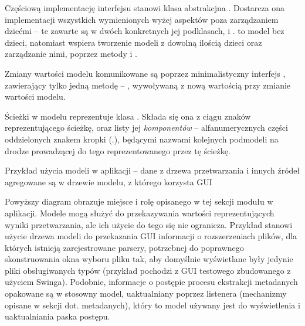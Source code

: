 Częściową implementację interfejsu  stanowi klasa abstrakcjna .
Dostarcza ona implementacji wszystkich wymienionych wyżej aspektów poza zarządzaniem dziećmi -- te
zawarte są w dwóch konkretnych jej podklasach,  i .
 to model bez dzieci, natomiast  wspiera tworzenie modeli z
dowolną ilością dzieci oraz zarządzanie nimi, poprzez metody  i .

Zmiany wartości modelu komunikowane są poprzez minimalistyczny interfejs ,
zawierający tylko jedną metodę -- , wywoływaną z nową wartością przy zmianie wartości
modelu.

Ścieżki w modelu reprezentuje klasa . Składa się ona z ciągu znaków reprezentującego
ścieżkę, oraz listy jej \emph{komponentów} -- alfanumerycznych części oddzielonych znakem kropki
(.), będącymi nazwami kolejnych podmodeli na drodze prowadzącej do tego reprezentowanego przez tę
ścieżkę.

{Przykład użycia modeli w aplikacji -- dane z drzewa przetwarzania i innych źródeł agregowane są w
drzewie modelu, z którego korzysta GUI}

Powyższy diagram obrazuje miejsce i rolę opisanego w tej sekcji modułu w aplikacji. Modele mogą
służyć do przekazywania wartości reprezentujących wyniki przetwarzania, ale ich użycie do tego się
nie ogranicza. Przykład stanowi użycie drzewa modeli do przekazania GUI informacji o rozszerzeniach
plików, dla których istnieją zarejestrowane parsery, potrzebnej do poprawnego skonstruowania okna
wyboru pliku tak, aby domyślnie wyświetlane były jedynie pliki obsługiwanych typów (przykład
pochodzi z GUI testowego zbudowanego z użyciem Swinga). Podobnie, informacje o postępie procesu
ekstrakcji metadanych opakowane są w stosowny model, uaktualniany poprzez listenera (mechanizmy
opisane w sekcji dot. metadanych), który to model używany jest do wyświetlenia i uaktualniania paska
postępu.


